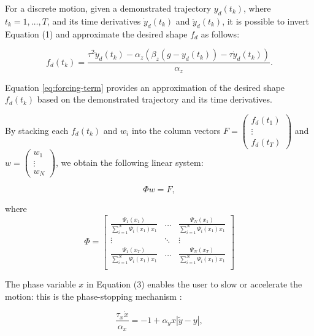 \documentclass[conference]{IEEEtran}
\begin{document}
For a discrete motion, given a demonstrated trajectory $y_d(t_k)$, where $t_k = 1, \ldots, T$, and its time derivatives $\dot{y}_d(t_k)$ and $\ddot{y}_d(t_k)$, it is possible to invert Equation (1) and approximate the desired shape $f_d$ as follows:

\begin{equation}
f_d(t_k) = \frac{\tau^2 \ddot{y}_d(t_k) - \alpha_z \left(\beta_z (g - y_d(t_k)) - \tau \dot{y}_d(t_k)\right)}{\alpha_z}.
\label{eq:forcing-term}
\end{equation}

Equation \ref{eq:forcing-term} provides an approximation of the desired shape $f_d(t_k)$ based on the demonstrated trajectory and its time derivatives.

By stacking each $f_d(t_k)$ and $w_i$ into the column vectors $F = \begin{pmatrix} f_d(t_1) \\ \vdots \\ f_d(t_T) \end{pmatrix}$ and $w = \begin{pmatrix} w_1 \\ \vdots \\ w_N \end{pmatrix}$, we obtain the following linear system:

\begin{equation}
\Phi w = F, 
\end{equation}

where
\begin{equation}
\Phi = \begin{bmatrix} 
    \frac{\Psi_1(x_1)}{\sum_{i=1}^{N} \Psi_i(x_1)x_1} & \ldots & \frac{\Psi_N(x_1)}{\sum_{i=1}^{N} \Psi_i(x_1)x_1} \\
    \vdots & \ddots & \vdots\\
    \frac{\Psi_1(x_T)}{\sum_{i=1}^{N} \Psi_i(x_1)x_1} & \ldots & \frac{\Psi_N(x_T)}{\sum_{i=1}^{N} \Psi_i(x_1)x_1} \\
    \end{bmatrix}
\end{equation} \newline

The phase variable $x$ in Equation (3) enables the user to slow or accelerate the motion: this is the phase-stopping mechanism \cite{ijspeert_movement_2002}:

\begin{equation}
\frac{\tau_x \dot{x}}{\alpha_x} = -1 + \alpha_y x \left| \tilde{y} - y \right|, 
\end{equation}
\end{document}
